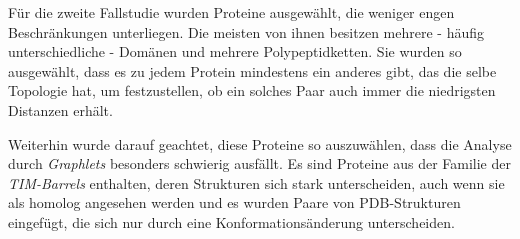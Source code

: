 \documentclass{report}
\begin{document}
F\"ur die zweite Fallstudie wurden Proteine ausgew\"ahlt, die weniger engen Beschr\"ankungen unterliegen. Die meisten von ihnen besitzen mehrere - h\"aufig unterschiedliche - Dom\"anen und mehrere Polypeptidketten. Sie wurden so ausgew\"ahlt, dass es zu jedem Protein mindestens ein anderes gibt, das die selbe Topologie hat, um festzustellen, ob ein solches Paar auch immer die niedrigsten Distanzen erh\"alt.

Weiterhin wurde darauf geachtet, diese Proteine so auszuw\"ahlen, dass die Analyse durch \textit{Graphlets} besonders schwierig ausf\"allt. Es sind Proteine aus der Familie der \textit{TIM-Barrels} enthalten, deren Strukturen sich stark unterscheiden, auch wenn sie als homolog angesehen werden und es wurden Paare von PDB-Strukturen eingef\"ugt, die sich nur durch eine Konformations\"anderung unterscheiden.
\end{document}
